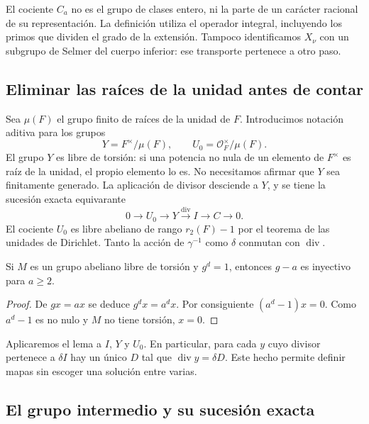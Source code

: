 El cociente $C_a$ no es el grupo de clases entero, ni la parte de un carácter racional de su representación. La definición utiliza el operador integral, incluyendo los primos que dividen el grado de la extensión. Tampoco identificamos $X_\nu$ con un subgrupo de Selmer del cuerpo inferior: ese transporte pertenece a otro paso.

\subsection{Eliminar las raíces de la unidad antes de contar}

Sea $\mu(F)$ el grupo finito de raíces de la unidad de $F$. Introducimos notación aditiva para los grupos
\begin{equation}
 Y=F^\times/\mu(F),\qquad
 U_0=\mathcal O_F^\times/\mu(F).
 \label{eq:cu-y}
\end{equation}
El grupo $Y$ es libre de torsión: si una potencia no nula de un elemento de $F^\times$ es raíz de la unidad, el propio elemento lo es. No necesitamos afirmar que $Y$ sea finitamente generado. La aplicación de divisor desciende a $Y$, y se tiene la sucesión exacta equivarante
\begin{equation}
 0\longrightarrow U_0\longrightarrow Y
 \xrightarrow{\operatorname{div}} I
 \longrightarrow C\longrightarrow0.
 \label{eq:cu-div}
\end{equation}
El cociente $U_0$ es libre abeliano de rango $r_2(F)-1$ por el teorema de las unidades de Dirichlet. Tanto la acción de $\gamma^{-1}$ como $\delta$ conmutan con $\operatorname{div}$.

\begin{lema}
\label{lem:cu-iny}
Si $M$ es un grupo abeliano libre de torsión y $g^d=1$, entonces $g-a$ es inyectivo para $a\ge2$.
\end{lema}
\begin{proof}
De $gx=ax$ se deduce $g^dx=a^dx$. Por consiguiente $(a^d-1)x=0$. Como $a^d-1$ es no nulo y $M$ no tiene torsión, $x=0$.
\end{proof}

Aplicaremos el lema a $I$, $Y$ y $U_0$. En particular, para cada $y$ cuyo divisor pertenece a $\delta I$ hay un único $D$ tal que $\operatorname{div}y=\delta D$. Este hecho permite definir mapas sin escoger una solución entre varias.

\subsection{El grupo intermedio y su sucesión exacta}

